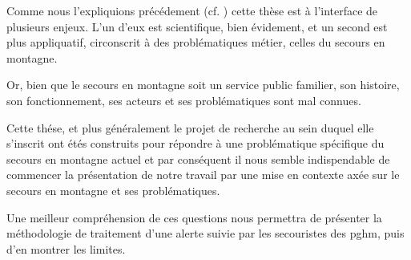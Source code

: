 Comme nous l'expliquions précédement (cf. ) cette
thèse est à l'interface de plusieurs enjeux. L'un d'eux est
scientifique, bien évidement, et un second est plus appliquatif,
circonscrit à des problématiques métier, celles du secours en
montagne.

Or, bien que le secours en montagne soit un service public familier,
son histoire, son fonctionnement, ses acteurs et ses problématiques
sont mal connues.

Cette thése, et plus généralement le projet de recherche au sein
duquel elle s'inscrit ont étés construits pour répondre à une
problématique spécifique du secours en montagne actuel et par
conséquent il nous semble indispendable de commencer la présentation
de notre travail par une mise en contexte axée sur le secours en
montagne et ses problématiques.

Une meilleur compréhension de ces questions nous permettra de
présenter la méthodologie de traitement d'une alerte suivie par les
secouristes des \ac{pghm}, puis d'en montrer les limites.